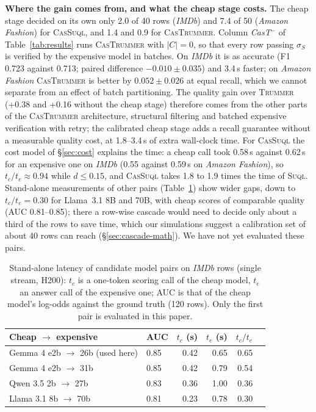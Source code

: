 \documentclass[sigconf]{acmart}
\begin{document}
\textbf{Where the gain comes from, and what the cheap stage costs.} The cheap stage decided on its own only 2.0 of 40 rows (\textit{IMDb}) and 7.4 of 50 (\textit{Amazon Fashion}) for \textsc{CasSuql}, and 1.4 and 0.9 for \textsc{CasTrummer}. Column \textit{CasT$^{-}$} of Table~\ref{tab:results} runs \textsc{CasTrummer} with $|C|{=}0$, so that every row passing $\sigma_S$ is verified by the expensive model in batches. On \textit{IMDb} it is as accurate (F1 0.723 against 0.713; paired difference $-0.010\pm0.035$) and 3.4\,s faster; on \textit{Amazon Fashion} \textsc{CasTrummer} is better by $0.052\pm0.026$ at equal recall, which we cannot separate from an effect of batch partitioning. The quality gain over \textsc{Trummer} (+0.38 and +0.16 without the cheap stage) therefore comes from the other parts of the \textsc{CasTrummer} architecture, structural filtering and batched expensive verification with retry; the calibrated cheap stage adds a recall guarantee without a measurable quality cost, at 1.8--3.4\,s of extra wall-clock time. For \textsc{CasSuql} the cost model of \S\ref{sec:cost} explains the time: a cheap call took 0.58\,s against 0.62\,s for an expensive one on \textit{IMDb} (0.55 against 0.59\,s on \textit{Amazon Fashion}), so $t_c/t_e\approx0.94$ while $d\le0.15$, and \textsc{CasSuql} takes 1.8 to 1.9 times the time of \textsc{Suql}. Stand-alone measurements of other pairs (Table~\ref{tab:pairs}) show wider gaps, down to $t_c/t_e=0.30$ for Llama~3.1 8B and 70B, with cheap scores of comparable quality (AUC 0.81--0.85); there a row-wise cascade would need to decide only about a third of the rows to save time, which our simulations suggest a calibration set of about 40 rows can reach (\S\ref{sec:cascade-math}). We have not yet evaluated these pairs.

\begin{table}[t]
\centering\footnotesize
\setlength{\tabcolsep}{4pt}
\begin{tabular}{llrrrr}
\toprule
Cheap $\to$ expensive & AUC & $t_c$ (s) & $t_e$ (s) & $t_c/t_e$ \\
\midrule
Gemma 4 e2b $\to$ 26b (used here) & 0.85 & 0.42 & 0.65 & 0.65 \\
Gemma 4 e2b $\to$ 31b & 0.85 & 0.42 & 0.79 & 0.54 \\
Qwen 3.5 2b $\to$ 27b & 0.83 & 0.36 & 1.00 & 0.36 \\
Llama 3.1 8b $\to$ 70b & 0.81 & 0.23 & 0.78 & 0.30 \\
\bottomrule
\end{tabular}
\caption{Stand-alone latency of candidate model pairs on \textit{IMDb} rows (single stream, H200): $t_c$ is a one-token scoring call of the cheap model, $t_e$ an answer call of the expensive one; AUC is that of the cheap model's log-odds against the ground truth (120 rows). Only the first pair is evaluated in this paper.}
\label{tab:pairs}
\end{table}
\end{document}
